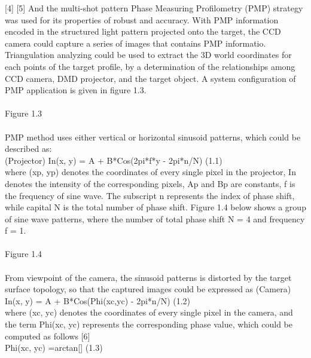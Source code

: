 [4]%
 [5] %
And the multi-shot pattern Phase Measuring Profilometry (PMP) strategy was used for its properties of robust and accuracy.
With PMP information encoded in the structured light pattern projected onto the target, the CCD camera could capture a series of images that contains PMP informatio. Triangulation analyzing could be used to extract the 3D world coordinates for each points of the target profile, by a determination of the relationships among CCD camera, DMD projector, and the target object. A system configuration of PMP application is given in figure 1.3.
 \\\\Figure 1.3\\%
 \\
 PMP  method uses either vertical or horizontal sinusoid patterns, which could be described as:\\
 (Projector) In(x, y) = A + B*Cos(2pi*f*y - 2pi*n/N)	   (1.1)%
 \\where (xp, yp) denotes the coordinates of every single pixel in the projector, In denotes the intensity of the corresponding pixels, Ap and Bp are constants, f is the frequency of sine wave. The subscript n represents the index of phase shift, while capital N is the total number of phase shift. Figure 1.4 below shows a group of sine wave patterns, where the number of total phase shift N = 4 and frequency f = 1.\\
 \\Figure 1.4\\%
\\
From viewpoint of the camera, the sinusoid patterns is distorted by the target surface topology, so that the captured images could be expressed as 
(Camera)    In(x, y) = A + B*Cos(Phi(xc,yc) - 2pi*n/N)    (1.2)%
\\where (xc, yc) denotes the coordinates of every single pixel in the camera, and the term Phi(xc, yc) represents the corresponding phase value, which could be computed as follows [6]\\
Phi(xc, yc) =arctan[]		(1.3) %
